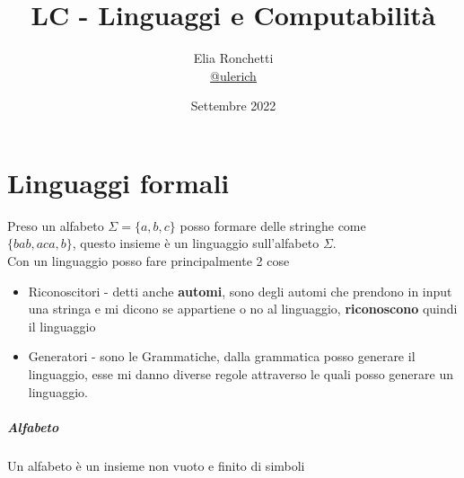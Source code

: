\documentclass[12pt, a4paper, openany]{book}
\begin{document}
\title{LC - Linguaggi e Computabilità}
\author{Elia Ronchetti\\
    \small{\href{https://t.me/ulerich}{@ulerich}}}
\date{Settembre 2022}

\maketitle
\tableofcontents

\chapter{Linguaggi formali}
Preso un alfabeto $\Sigma=\{a,b,c\}$ posso formare delle stringhe come
\\ $\{bab, aca, b\}$, questo insieme è un linguaggio sull'alfabeto $\Sigma$.
\\ Con un linguaggio posso fare principalmente 2 cose
\begin{itemize}
    \item Riconoscitori - detti anche \textbf{automi}, sono degli automi che prendono in input
    una stringa e mi dicono se appartiene o no al linguaggio, \textbf{riconoscono} quindi il linguaggio
    \item Generatori - sono le Grammatiche, dalla grammatica posso generare il linguaggio,
    esse mi danno diverse regole attraverso le quali posso generare un linguaggio.
\end{itemize}
\paragraph*{Alfabeto} Un alfabeto è un insieme non vuoto e finito di simboli
\end{document}
